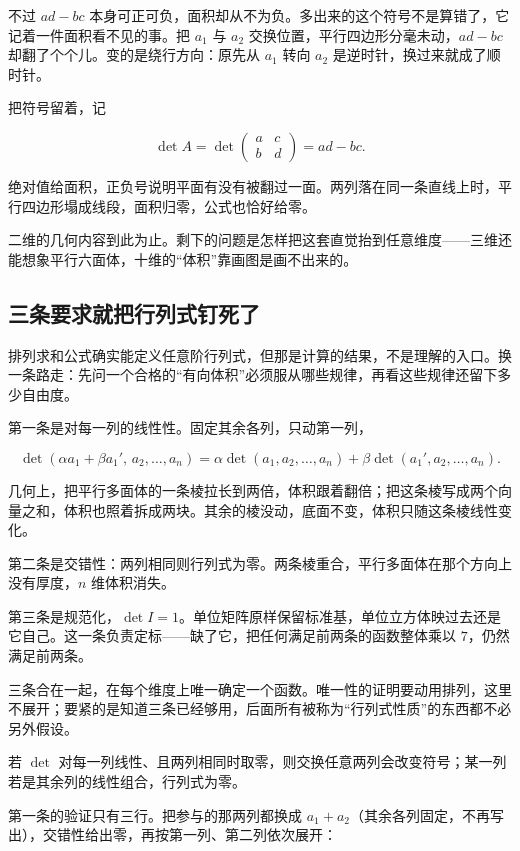 不过 \(ad-bc\) 本身可正可负，面积却从不为负。多出来的这个符号不是算错了，它记着一件面积看不见的事。把 \(a_1\) 与 \(a_2\) 交换位置，平行四边形分毫未动，\(ad-bc\) 却翻了个个儿。变的是绕行方向：原先从 \(a_1\) 转向 \(a_2\) 是逆时针，换过来就成了顺时针。

把符号留着，记

\[
\det A=\det\begin{pmatrix}a&c\\b&d\end{pmatrix}=ad-bc.
\]

绝对值给面积，正负号说明平面有没有被翻过一面。两列落在同一条直线上时，平行四边形塌成线段，面积归零，公式也恰好给零。

二维的几何内容到此为止。剩下的问题是怎样把这套直觉抬到任意维度——三维还能想象平行六面体，十维的``体积''靠画图是画不出来的。

\subsection{三条要求就把行列式钉死了}

排列求和公式确实能定义任意阶行列式，但那是计算的结果，不是理解的入口。换一条路走：先问一个合格的``有向体积''必须服从哪些规律，再看这些规律还留下多少自由度。

第一条是对每一列的线性性。固定其余各列，只动第一列，

\[
\det(\alpha a_1+\beta a_1',\,a_2,\ldots,a_n)
=\alpha\det(a_1,a_2,\ldots,a_n)+\beta\det(a_1',a_2,\ldots,a_n).
\]

几何上，把平行多面体的一条棱拉长到两倍，体积跟着翻倍；把这条棱写成两个向量之和，体积也照着拆成两块。其余的棱没动，底面不变，体积只随这条棱线性变化。

第二条是交错性：两列相同则行列式为零。两条棱重合，平行多面体在那个方向上没有厚度，\(n\) 维体积消失。

第三条是规范化，\(\det I=1\)。单位矩阵原样保留标准基，单位立方体映过去还是它自己。这一条负责定标——缺了它，把任何满足前两条的函数整体乘以 \(7\)，仍然满足前两条。

三条合在一起，在每个维度上唯一确定一个函数。唯一性的证明要动用排列，这里不展开；要紧的是知道三条已经够用，后面所有被称为``行列式性质''的东西都不必另外假设。

\begin{proposition}
若 \(\det\) 对每一列线性、且两列相同时取零，则交换任意两列会改变符号；某一列若是其余列的线性组合，行列式为零。
\end{proposition}

第一条的验证只有三行。把参与的那两列都换成 \(a_1+a_2\)（其余各列固定，不再写出），交错性给出零，再按第一列、第二列依次展开：

